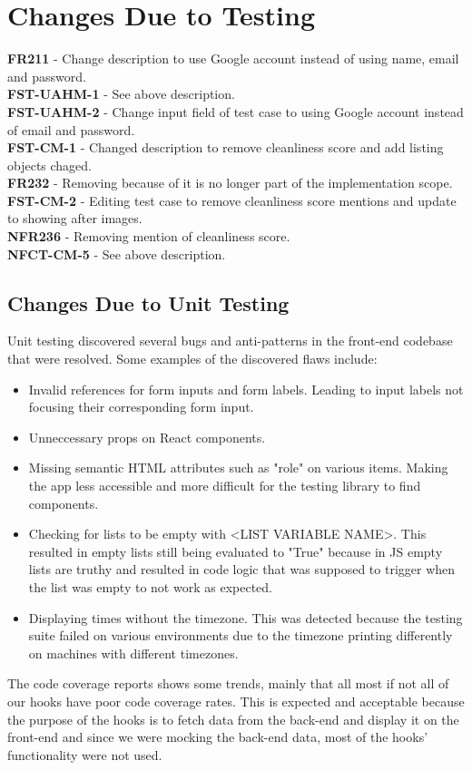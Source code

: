 \documentclass[12pt, titlepage]{article}
\begin{document}
\section{Changes Due to Testing}
\textbf{FR211} - Change description to use Google account instead of using name, email and password.\\
\textbf{FST-UAHM-1} - See above description. \\
\textbf{FST-UAHM-2} - Change input field of test case to using Google account instead of email and password. \\
\textbf{FST-CM-1} - Changed description to remove cleanliness score and add listing objects chaged. \\
\textbf{FR232} - Removing because of it is no longer part of the implementation scope. \\
\textbf{FST-CM-2} - Editing test case to remove cleanliness score mentions and update to showing after images. \\
\textbf{NFR236} - Removing mention of cleanliness score. \\
\textbf{NFCT-CM-5} - See above description. \\



\subsection{Changes Due to Unit Testing}
Unit testing discovered several bugs and anti-patterns in the front-end codebase that were resolved. Some examples of the discovered flaws include:
\begin{itemize}
\item Invalid references for form inputs and form labels. Leading to input labels not focusing their corresponding form input.
\item Unneccessary props on React components.
\item Missing semantic HTML attributes such as "role" on various items. Making the app less accessible and more difficult for the testing library to find components.
\item Checking for lists to be empty with <LIST VARIABLE NAME>. This resulted in empty lists still being evaluated to "True" because in JS empty lists are truthy and resulted in code logic that was supposed to trigger when the list was empty to not work as expected.
\item Displaying times without the timezone. This was detected because the testing suite failed on various environments due to the timezone printing differently on machines with different timezones.
\end{itemize}
The code coverage reports shows some trends, mainly that all most if not all of our hooks have poor code coverage rates. This is expected and acceptable because the purpose of the hooks is to fetch data from the back-end and display it on the front-end and since we were mocking the back-end data, most of the hooks' functionality were not used.
\end{document}
